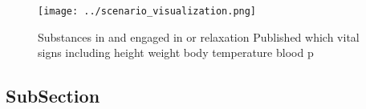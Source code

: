 \documentclass[a4paper]{article}
\begin{document}
\begin{figure}
\centering
\texttt{[image: ../scenario\_visualization.png]}
\caption{Substances in and engaged in or relaxation Published which vital signs including height weight body temperature blood p
}
\end{figure}
 
\subsection{SubSection}
\end{document}
